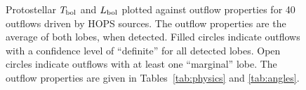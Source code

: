 \documentclass[twocolumn]{aastex63}
\begin{document}
\begin{figure}
\begin{minipage}{.5\linewidth}
\end{minipage}%
\begin{minipage}{.5\linewidth}
\centering
{}
\end{minipage}\par\medskip
\caption{Protostellar $T_{\rm bol}$ and $L_{\rm bol}$ plotted against outflow properties for 40 outflows driven by HOPS sources. The outflow properties are the average of both lobes, when detected. Filled circles indicate outflows with a confidence level of ``definite'' for all detected lobes. Open circles indicate outflows with at least one ``marginal'' lobe. The outflow properties are given in Tables~\ref{tab:physics} and \ref{tab:angles}.}
\label{fig:appendix_scatter}
\end{figure}
\end{document}

